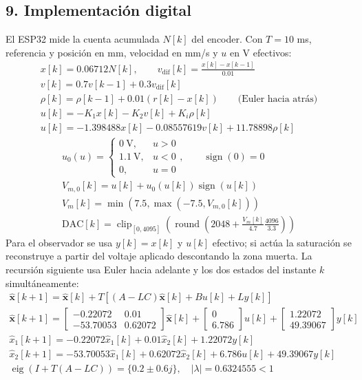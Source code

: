 \documentclass[11pt]{article}
\begin{document}
\subsection*{9. Implementación digital}
El ESP32 mide la cuenta acumulada $N[k]$ del encoder. Con $T=10$ ms, referencia y posición en mm, velocidad en mm/s y $u$ en V efectivos:
\begin{gather*}
x[k]=0.06712N[k],\qquad v_{\mathrm{dif}}[k]=\frac{x[k]-x[k-1]}{0.01}\\
v[k]=0.7v[k-1]+0.3v_{\mathrm{dif}}[k]\\
\rho[k]=\rho[k-1]+0.01(r[k]-x[k])\qquad\text{(Euler hacia atrás)}\\
u[k]=-K_1x[k]-K_2v[k]+K_i\rho[k]\\
u[k]=-1.398488x[k]-0.08557619v[k]+11.78898\rho[k]
\end{gather*}
\begin{gather*}
u_0(u)=\begin{cases}0~\text{V},&u>0\\1.1~\text{V},&u<0\\0,&u=0\end{cases},\qquad\operatorname{sign}(0)=0\\
V_{m,0}[k]=u[k]+u_0(u[k])\operatorname{sign}(u[k])\\
V_m[k]=\min(7.5,\max(-7.5,V_{m,0}[k]))\\
\mathrm{DAC}[k]=\operatorname{clip}_{[0,4095]}\!\left(\operatorname{round}\!\left(2048+\frac{V_m[k]}{4.7}\frac{4096}{3.3}\right)\right)
\end{gather*}
Para el observador se usa $y[k]=x[k]$ y $u[k]$ efectivo; si actúa la saturación se reconstruye a partir del voltaje aplicado descontando la zona muerta. La recursión siguiente usa Euler hacia adelante y los dos estados del instante $k$ simultáneamente:
\begin{gather*}
\hat{\mathbf x}[k+1]=\hat{\mathbf x}[k]+T[(A-LC)\hat{\mathbf x}[k]+Bu[k]+Ly[k]]\\
\hat{\mathbf x}[k+1]=\begin{bmatrix}-0.22072 & 0.01 \\ -53.70053 & 0.62072\end{bmatrix}\hat{\mathbf x}[k]+\begin{bmatrix}0 \\ 6.786\end{bmatrix}u[k]+\begin{bmatrix}1.22072 \\ 49.39067\end{bmatrix}y[k]\\
\hat x_1[k+1]=-0.22072\hat x_1[k]+0.01\hat x_2[k]+1.22072y[k]\\
\hat x_2[k+1]=-53.70053\hat x_1[k]+0.62072\hat x_2[k]+6.786u[k]+49.39067y[k]\\
\operatorname{eig}(I+T(A-LC))=\{0.2\pm 0.6j\},\quad |\lambda|=0.6324555<1
\end{gather*}
\end{document}
